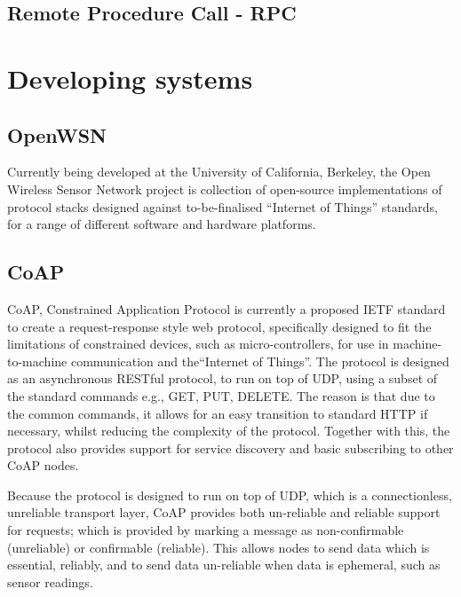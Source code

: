 \subsection{Remote Procedure Call - RPC} %
\label{sub:rpc}


\section{Developing systems} %
\label{sec:developing_systems}

\subsection{OpenWSN} %
\label{sub:owsn_berkeley}
Currently being developed at the University of California, Berkeley, the Open Wireless Sensor Network project is collection of open-source implementations of protocol stacks designed against to-be-finalised ``Internet of Things'' standards, for a range of different software and hardware platforms.



\subsection{CoAP} %
\label{ssub:coap}
CoAP, Constrained Application Protocol is currently a proposed IETF standard to create a request-response style web protocol, specifically designed to fit the limitations of constrained devices, such as micro-controllers, for use in machine-to-machine communication and the``Internet of Things''. The protocol is designed as an asynchronous RESTful protocol, to run on top of UDP, using a subset of the standard commands e.g., GET, PUT, DELETE. The reason is that due to the common commands, it allows for an easy transition to standard HTTP if necessary, whilst reducing the complexity of the protocol. Together with this, the protocol also provides support for service discovery and basic subscribing to other CoAP nodes.

Because the protocol is designed to run on top of UDP, which is a connectionless, unreliable transport layer, CoAP provides both un-reliable and reliable support for requests; which is provided by marking a message as non-confirmable (unreliable) or confirmable (reliable). This allows nodes to send data which is essential, reliably, and to send data un-reliable when data is ephemeral, such as sensor readings.   

